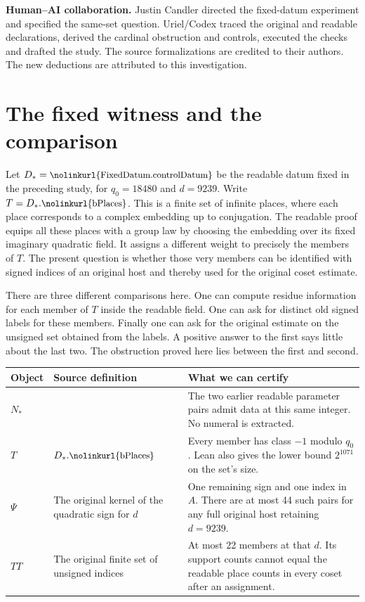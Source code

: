 \documentclass[12pt,letterpaper]{article}
\newcommand{\id}[1]{\ifmmode\text{\small\nolinkurl{#1}}\else{\small\nolinkurl{#1}}\fi}
\begin{document}
\medskip\textbf{Human--AI collaboration.} Justin Candler directed the fixed-datum experiment and specified the same-set question. Uriel/Codex traced the original and readable declarations, derived the cardinal obstruction and controls, executed the checks and drafted the study. The source formalizations are credited to their authors. The new deductions are attributed to this investigation.
\clearpage\begingroup\small\setlength{\parskip}{0pt}\tableofcontents\endgroup
\clearpage{}
\section{The fixed witness and the comparison}
Let $D_*=\id{FixedDatum.controlDatum}$ be the readable datum fixed in the preceding study, for $q_0=18480$ and $d=9239$. Write $T=D_*.\id{bPlaces}$. This is a finite set of infinite places, where each place corresponds to a complex embedding up to conjugation. The readable proof equips all these places with a group law by choosing the embedding over its fixed imaginary quadratic field. It assigns a different weight to precisely the members of $T$. The present question is whether those very members can be identified with signed indices of an original host and thereby used for the original coset estimate.

There are three different comparisons here. One can compute residue information for each member of $T$ inside the readable field. One can ask for distinct old signed labels for these members. Finally one can ask for the original estimate on the unsigned set obtained from the labels. A positive answer to the first says little about the last two. The obstruction proved here lies between the first and second.

\begin{center}\small
\begin{tabularx}{\linewidth}{@{}p{.23\linewidth}YY@{}}\toprule
Object & Source definition & What we can certify\\\midrule
$N_*$ & \id{FixedDatum.fixedN} & The two earlier readable parameter pairs admit data at this same integer. No numeral is extracted.\\
$T$ & $D_*.\id{bPlaces}$ & Every member has class $-1$ modulo $q_0$. Lean also gives the lower bound $2^{1071}$ on the set's size.\\
$\Psi$ & The original kernel of the quadratic sign for $d$ & One remaining sign and one index in $A$. There are at most 44 such pairs for any full original host retaining $d=9239$.\\
$TT$ & The original finite set of unsigned indices & At most 22 members at that $d$. Its support counts cannot equal the readable place counts in every coset after an assignment.\\\bottomrule
\end{tabularx}
\end{center}
\end{document}
